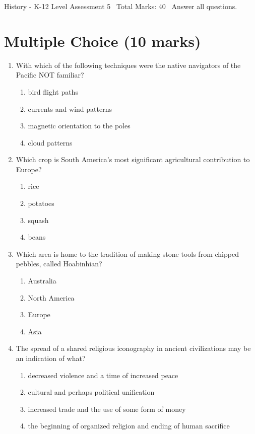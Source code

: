 \documentclass[12pt]{article}
\begin{document}
\begin{center}
History - K-12 Level Assessment 5 \
Total Marks: 40 \
Answer all questions.
\end{center}

\section*{Multiple Choice (10 marks)}
\begin{enumerate}[label=\arabic*.]
\item With which of the following techniques were the native navigators of the Pacific NOT familiar?
\begin{enumerate}[label=(\alph*)]
    \item bird flight paths
    \item currents and wind patterns
    \item magnetic orientation to the poles
    \item cloud patterns
\end{enumerate}
\item Which crop is South America's most significant agricultural contribution to Europe?
\begin{enumerate}[label=(\alph*)]
    \item rice
    \item potatoes
    \item squash
    \item beans
\end{enumerate}
\item Which area is home to the tradition of making stone tools from chipped pebbles, called Hoabinhian?
\begin{enumerate}[label=(\alph*)]
    \item Australia
    \item North America
    \item Europe
    \item Asia
\end{enumerate}
\item The spread of a shared religious iconography in ancient civilizations may be an indication of what?
\begin{enumerate}[label=(\alph*)]
    \item decreased violence and a time of increased peace
    \item cultural and perhaps political unification
    \item increased trade and the use of some form of money
    \item the beginning of organized religion and ending of human sacrifice

\end{enumerate}
\end{enumerate}
\end{document}
